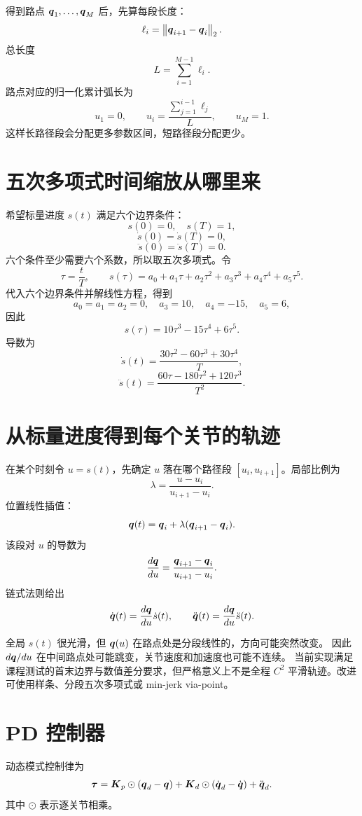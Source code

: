 得到路点 $\boldsymbol{q}_1,\ldots,\boldsymbol{q}_M$ 后，先算每段长度：
\[
\ell_i=\left\lVert \boldsymbol{q}_{i+1}-\boldsymbol{q}_i\right\rVert_2.
\]
总长度
\[
L=\sum_{i=1}^{M-1}\ell_i.
\]
路点对应的归一化累计弧长为
\[
u_1=0,\qquad
u_i=\frac{\sum_{j=1}^{i-1}\ell_j}{L},\qquad
u_M=1.
\]
这样长路径段会分配更多参数区间，短路径段分配更少。

\section{五次多项式时间缩放从哪里来}

希望标量进度 $s(t)$ 满足六个边界条件：
\[
s(0)=0,\quad s(T)=1,
\]
\[
\dot{s}(0)=\dot{s}(T)=0,
\]
\[
\ddot{s}(0)=\ddot{s}(T)=0.
\]
六个条件至少需要六个系数，所以取五次多项式。令
\[
\tau=\frac{t}{T},\qquad
s(\tau)=a_0+a_1\tau+a_2\tau^2+a_3\tau^3+a_4\tau^4+a_5\tau^5.
\]
代入六个边界条件并解线性方程，得到
\[
a_0=a_1=a_2=0,\quad a_3=10,\quad a_4=-15,\quad a_5=6,
\]
因此
\[
s(\tau)=10\tau^3-15\tau^4+6\tau^5.
\]
导数为
\[
\dot{s}(t)=
\frac{30\tau^2-60\tau^3+30\tau^4}{T},
\]
\[
\ddot{s}(t)=
\frac{60\tau-180\tau^2+120\tau^3}{T^2}.
\]

\section{从标量进度得到每个关节的轨迹}

在某个时刻令 $u=s(t)$，先确定 $u$ 落在哪个路径段
$[u_i,u_{i+1}]$。局部比例为
\[
\lambda=\frac{u-u_i}{u_{i+1}-u_i}.
\]
位置线性插值：
\[
\boldsymbol{q}(t)=\boldsymbol{q}_i+\lambda(\boldsymbol{q}_{i+1}-\boldsymbol{q}_i).
\]
该段对 $u$ 的导数为
\[
\frac{d\boldsymbol{q}}{du}=
\frac{\boldsymbol{q}_{i+1}-\boldsymbol{q}_i}{u_{i+1}-u_i}.
\]
链式法则给出
\[
\dot{\boldsymbol{q}}(t)=\frac{d\boldsymbol{q}}{du}\dot{s}(t),
\qquad
\ddot{\boldsymbol{q}}(t)=\frac{d\boldsymbol{q}}{du}\ddot{s}(t).
\]

\begin{warningbox}[当前轨迹并非在路点处完全光滑]
全局 $s(t)$ 很光滑，但 $\boldsymbol{q}(u)$ 在路点处是分段线性的，方向可能突然改变。
因此 $d\boldsymbol{q}/du$ 在中间路点处可能跳变，关节速度和加速度也可能不连续。
当前实现满足课程测试的首末边界与数值差分要求，但严格意义上不是全程
$C^2$ 平滑轨迹。改进可使用样条、分段五次多项式或 min-jerk via-point。
\end{warningbox}

\section{PD 控制器}

动态模式控制律为
\[
\boldsymbol{\tau}=
\boldsymbol{K}_p\odot(\boldsymbol{q}_d-\boldsymbol{q})
+\boldsymbol{K}_d\odot(\dot{\boldsymbol{q}}_d-\dot{\boldsymbol{q}})
+\ddot{\boldsymbol{q}}_d.
\]
其中 $\odot$ 表示逐关节相乘。

